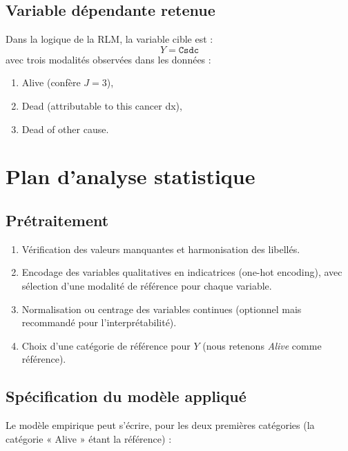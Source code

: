 \documentclass[12pt,a4paper]{article}
\begin{document}
\subsection{Variable dépendante retenue}

Dans la logique de la RLM, la variable cible est :
\begin{equation*}
Y = \texttt{Csdc}
\end{equation*}
avec trois modalités observées dans les données :
\begin{enumerate}[label=\arabic*.]
    \item Alive (confère $J = 3$),
    \item Dead (attributable to this cancer dx),
    \item Dead of other cause.
\end{enumerate}

\section{Plan d'analyse statistique}

\subsection{Prétraitement}

\begin{enumerate}[label=\arabic*.]
    \item Vérification des valeurs manquantes et harmonisation des libellés.
    \item Encodage des variables qualitatives en indicatrices (one-hot encoding), avec sélection d'une modalité de référence pour chaque variable.
    \item Normalisation ou centrage des variables continues (optionnel mais recommandé pour l'interprétabilité).
    \item Choix d'une catégorie de référence pour $Y$ (nous retenons \textit{Alive} comme référence).
\end{enumerate}

\subsection{Spécification du modèle appliqué}

Le modèle empirique peut s'écrire, pour les deux premières catégories (la catégorie « Alive » étant la référence) :
\end{document}
